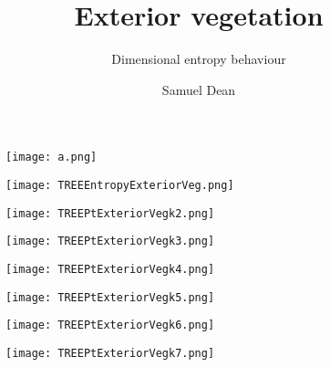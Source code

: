 \documentclass[pdf]{beamer}
\title{\textbf{Exterior vegetation}}
\subtitle{Dimensional entropy behaviour}
\author{Samuel Dean}
\begin{document}
\begin{frame}
\titlepage
\end{frame}

\begin{frame}
\begin{figure}[!h]
\centering
\texttt{[image: a.png]}
\end{figure}
\end{frame}

\begin{frame}
\begin{figure}[!h]
\centering
\texttt{[image: TREEEntropyExteriorVeg.png]}
\end{figure}
\end{frame}

\begin{frame}
\begin{figure}[!h]
\centering
\texttt{[image: TREEPtExteriorVegk2.png]}
\end{figure}
\end{frame}

\begin{frame}
\begin{figure}[!h]
\centering
\texttt{[image: TREEPtExteriorVegk3.png]}
\end{figure}
\end{frame}

\begin{frame}
\begin{figure}[!h]
\centering
\texttt{[image: TREEPtExteriorVegk4.png]}
\end{figure}
\end{frame}

\begin{frame}
\begin{figure}[!h]
\centering
\texttt{[image: TREEPtExteriorVegk5.png]}
\end{figure}
\end{frame}

\begin{frame}
\begin{figure}[!h]
\centering
\texttt{[image: TREEPtExteriorVegk6.png]}
\end{figure}
\end{frame}

\begin{frame}
\begin{figure}[!h]
\centering
\texttt{[image: TREEPtExteriorVegk7.png]}
\end{figure}
\end{frame}
\end{document}
